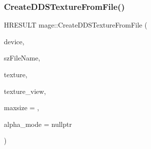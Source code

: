 \hypertarget{namespacemage_a9ebb3d4391bb4b5b1393fc1efce57d8e}{}\label{namespacemage_a9ebb3d4391bb4b5b1393fc1efce57d8e} 
\subsubsection{\texorpdfstring{Create\+D\+D\+S\+Texture\+From\+File()}{CreateDDSTextureFromFile()}\hspace{0.1cm}{\footnotesize\ttfamily [1/4]}}
{\footnotesize\ttfamily H\+R\+E\+S\+U\+LT mage\+::\+Create\+D\+D\+S\+Texture\+From\+File (\begin{DoxyParamCaption}\item[{\+\_\+\+In\+\_\+ I\+D3\+D11\+Device2 $\ast$}]{device,  }\item[{\+\_\+\+In\+\_\+z\+\_\+ const wchar\+\_\+t $\ast$}]{sz\+File\+Name,  }\item[{\+\_\+\+Outptr\+\_\+opt\+\_\+ I\+D3\+D11\+Resource $\ast$$\ast$}]{texture,  }\item[{\+\_\+\+Outptr\+\_\+opt\+\_\+ I\+D3\+D11\+Shader\+Resource\+View $\ast$$\ast$}]{texture\+\_\+view,  }\item[{\+\_\+\+In\+\_\+ size\+\_\+t}]{maxsize = {},  }\item[{\+\_\+\+Out\+\_\+opt\+\_\+ \hyperlink{namespacemage_a0c586a2bad862f4858900ca121ca80c2}{D\+D\+S\+\_\+\+A\+L\+P\+H\+A\+\_\+\+M\+O\+DE} $\ast$}]{alpha\+\_\+mode = {\ttfamily nullptr} }\end{DoxyParamCaption})}

\hypertarget{namespacemage_abec1d90d8e2d6c8ce1bfa74c2854bdfe}{}\label{namespacemage_abec1d90d8e2d6c8ce1bfa74c2854bdfe} 
